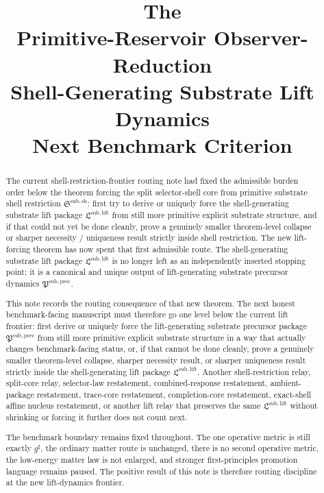 \documentclass[11pt]{article}
\title{\textbf{The \TheoryName{}}\\[0.4em]
\large Primitive-Reservoir Observer-Reduction\\
\large Shell-Generating Substrate Lift Dynamics\\
\large Next Benchmark Criterion}
\author{}
\date{}
\newcommand{\CompletedMetric}{g^{\sharp}}
\newcommand{\ShellRestriction}{\mathfrak S^{\mathrm{sub,sh}}}
\newcommand{\LiftPackage}{\mathfrak L^{\mathrm{sub,lift}}}
\newcommand{\PrecursorPackage}{\mathfrak P^{\mathrm{sub,prec}}}
\begin{document}
\maketitle

\begin{abstract}
The current shell-restriction-frontier routing note had fixed the admissible burden order below the theorem forcing the split selector-shell core from primitive substrate shell restriction \(\ShellRestriction\): first try to derive or uniquely force the shell-generating substrate lift package \(\LiftPackage\) from still more primitive explicit substrate structure, and if that could not yet be done cleanly, prove a genuinely smaller theorem-level collapse or sharper necessity / uniqueness result strictly inside shell restriction. The new lift-forcing theorem has now spent that first admissible route. The shell-generating substrate lift package \(\LiftPackage\) is no longer left as an independently inserted stopping point; it is a canonical and unique output of lift-generating substrate precursor dynamics \(\PrecursorPackage\).

This note records the routing consequence of that new theorem. The next honest benchmark-facing manuscript must therefore go one level below the current lift frontier: first derive or uniquely force the lift-generating substrate precursor package \(\PrecursorPackage\) from still more primitive explicit substrate structure in a way that actually changes benchmark-facing status, or, if that cannot be done cleanly, prove a genuinely smaller theorem-level collapse, sharper necessity result, or sharper uniqueness result strictly inside the shell-generating lift package \(\LiftPackage\). Another shell-restriction relay, split-core relay, selector-law restatement, combined-response restatement, ambient-package restatement, trace-core restatement, completion-core restatement, exact-shell affine nucleus restatement, or another lift relay that preserves the same \(\LiftPackage\) without shrinking or forcing it further does not count next.

The benchmark boundary remains fixed throughout. The one operative metric is still exactly \(\CompletedMetric\), the ordinary matter route is unchanged, there is no second operative metric, the low-energy matter law is not enlarged, and stronger first-principles promotion language remains paused. The positive result of this note is therefore routing discipline at the new lift-dynamics frontier.
\end{abstract}
\end{document}
